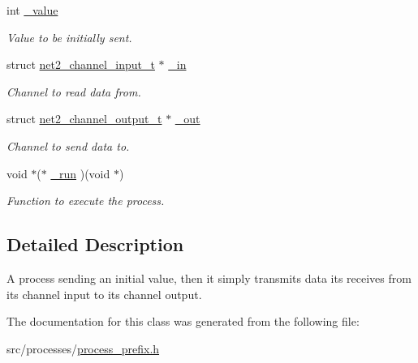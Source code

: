 \begin{DoxyCompactItemize}
\item 
\hypertarget{structprocess__prefix__int__t_a3eb6bb5119e08bf5a9696eec979125f9}{int \hyperlink{structprocess__prefix__int__t_a3eb6bb5119e08bf5a9696eec979125f9}{\-\_\-value}}\label{structprocess__prefix__int__t_a3eb6bb5119e08bf5a9696eec979125f9}

\begin{DoxyCompactList}\small\item\em Value to be initially sent. \end{DoxyCompactList}\item 
\hypertarget{structprocess__prefix__int__t_ad19e6225649b296a9e7b4b3b369c6ebb}{struct \hyperlink{structnet2__channel__input__t}{net2\-\_\-channel\-\_\-input\-\_\-t} $\ast$ \hyperlink{structprocess__prefix__int__t_ad19e6225649b296a9e7b4b3b369c6ebb}{\-\_\-in}}\label{structprocess__prefix__int__t_ad19e6225649b296a9e7b4b3b369c6ebb}

\begin{DoxyCompactList}\small\item\em Channel to read data from. \end{DoxyCompactList}\item 
\hypertarget{structprocess__prefix__int__t_a96137e412c64efd095310606260dddb4}{struct \hyperlink{structnet2__channel__output__t}{net2\-\_\-channel\-\_\-output\-\_\-t} $\ast$ \hyperlink{structprocess__prefix__int__t_a96137e412c64efd095310606260dddb4}{\-\_\-out}}\label{structprocess__prefix__int__t_a96137e412c64efd095310606260dddb4}

\begin{DoxyCompactList}\small\item\em Channel to send data to. \end{DoxyCompactList}\item 
\hypertarget{structprocess__prefix__int__t_a572f7b83420cd0eff38ad63f4de53bb5}{void $\ast$($\ast$ \hyperlink{structprocess__prefix__int__t_a572f7b83420cd0eff38ad63f4de53bb5}{\-\_\-run} )(void $\ast$)}\label{structprocess__prefix__int__t_a572f7b83420cd0eff38ad63f4de53bb5}

\begin{DoxyCompactList}\small\item\em Function to execute the process. \end{DoxyCompactList}\end{DoxyCompactItemize}


\subsection{Detailed Description}
A process sending an initial value, then it simply transmits data its receives from its channel input to its channel output. 

The documentation for this class was generated from the following file\-:\begin{DoxyCompactItemize}
\item 
src/processes/\hyperlink{process__prefix_8h}{process\-\_\-prefix.\-h}\end{DoxyCompactItemize}
